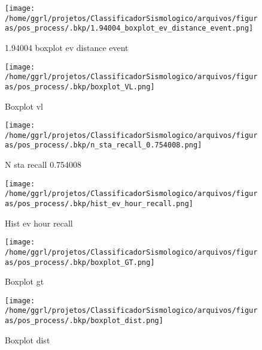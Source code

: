                     \begin{figure}[H]
                        \centering
                        \texttt{[image: /home/ggrl/projetos/ClassificadorSismologico/arquivos/figuras/pos\_process/.bkp/1.94004\_boxplot\_ev\_distance\_event.png]}
                        \caption{1.94004 boxplot ev distance event}
                        \label{fig:1.94004_boxplot_ev_distance_event}
                    \end{figure}
                

                    \begin{figure}[H]
                        \centering
                        \texttt{[image: /home/ggrl/projetos/ClassificadorSismologico/arquivos/figuras/pos\_process/.bkp/boxplot\_VL.png]}
                        \caption{Boxplot vl}
                        \label{fig:boxplot_VL}
                    \end{figure}
                

                    \begin{figure}[H]
                        \centering
                        \texttt{[image: /home/ggrl/projetos/ClassificadorSismologico/arquivos/figuras/pos\_process/.bkp/n\_sta\_recall\_0.754008.png]}
                        \caption{N sta recall 0.754008}
                        \label{fig:n_sta_recall_0.754008}
                    \end{figure}
                

                    \begin{figure}[H]
                        \centering
                        \texttt{[image: /home/ggrl/projetos/ClassificadorSismologico/arquivos/figuras/pos\_process/.bkp/hist\_ev\_hour\_recall.png]}
                        \caption{Hist ev hour recall}
                        \label{fig:hist_ev_hour_recall}
                    \end{figure}
                

                    \begin{figure}[H]
                        \centering
                        \texttt{[image: /home/ggrl/projetos/ClassificadorSismologico/arquivos/figuras/pos\_process/.bkp/boxplot\_GT.png]}
                        \caption{Boxplot gt}
                        \label{fig:boxplot_GT}
                    \end{figure}
                

                    \begin{figure}[H]
                        \centering
                        \texttt{[image: /home/ggrl/projetos/ClassificadorSismologico/arquivos/figuras/pos\_process/.bkp/boxplot\_dist.png]}
                        \caption{Boxplot dist}
                        \label{fig:boxplot_dist}
                    \end{figure}
                

